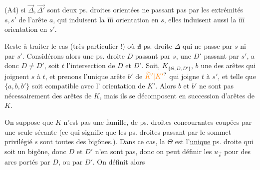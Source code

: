 (A4) si $\vec\Delta,\vec{\Delta'}$ sont deux ps. droites orientées
ne passant pas par les extrémités $s,s'$ de
l'arête $a$, qui induisent la $\overline{\textrm m}$ orientation en
$s$, elles induisent aussi la $\overline{\textrm m}$ orientation en $s'$.

Reste à traiter le cas (très particulier !) où
$\nexists$ ps. droite $\Delta$ qui ne passe par $s$ ni par $s'$.
Considérons alors une ps. droite $D$ \inserted{$\ne\Theta$} passant par
$s$,  une $D'$ \inserted{$\ne\Theta$} passant par $s'$,
 a donc $D\ne D'$, soit
$t$ l'intersection de $D$ et $D'$.
Soit,   $K_{\{\Theta,D,D'\}}$,
$b$ une des arêtes qui joignent $s$ à $t$, et prenons
l'unique arête $b'$ de $\unsure{\widetilde K'|K'}$ qui joigne $t$ à $s'$, et
telle que $\{a,b,b'\}$ soit compatible avec l'
orientation de $K'$. Alors $b$ et $b'$ ne sont pas
nécessairement des arêtes de $K$, mais ils
se décomposent en succession d'arêtes de $K$.

On suppose que $K$ n'est pas  une 
famille, de  ps. droites concourantes
coupées par une seule sécante (ce qui
signifie que les  ps. droites passant par
le sommet privilégié $s$ sont toutes des
bigônes.). Dans ce cas, la  $\Theta$
est l'\uline{unique} ps. droite qui soit un bigône,
donc $D$ et $D'$ n'en sont pas, donc on
peut définir les $u_{\vec c}$ pour des arcs  portés
par $D$, ou par $D'$. On définit alors

